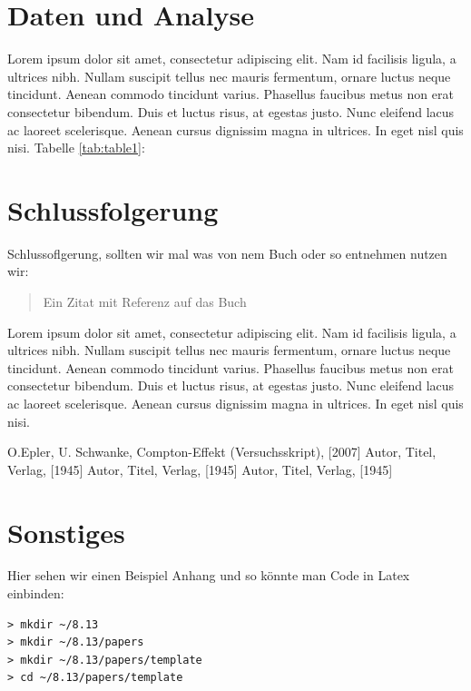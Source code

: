 \documentclass[aps,twocolumn,secnumarabic,nobalancelastpage,amsmath,amssymb,
nofootinbib,superscriptaddress]{revtex4-1}
\begin{document}
\section{Daten und Analyse}

Lorem ipsum dolor sit amet, consectetur adipiscing elit. Nam id facilisis ligula,
a ultrices nibh. Nullam suscipit tellus nec mauris fermentum, ornare luctus neque
tincidunt. Aenean commodo tincidunt varius. Phasellus faucibus metus non erat
consectetur bibendum. Duis et luctus risus, at egestas justo. Nunc eleifend lacus
ac laoreet scelerisque. Aenean cursus dignissim magna in ultrices. In eget nisl
quis nisi. Tabelle \ref{tab:table1}:







\section{Schlussfolgerung}

Schlussoflgerung, sollten wir mal was von nem Buch oder so entnehmen nutzen wir:


\begin{quote}
  Ein Zitat mit Referenz auf das Buch\cite{melissinos1966}
\end{quote}

Lorem ipsum dolor sit amet, consectetur adipiscing elit. Nam id facilisis ligula,
a ultrices nibh. Nullam suscipit tellus nec mauris fermentum, ornare luctus neque
tincidunt. Aenean commodo tincidunt varius. Phasellus faucibus metus non erat
consectetur bibendum. Duis et luctus risus, at egestas justo. Nunc eleifend lacus
ac laoreet scelerisque. Aenean cursus dignissim magna in ultrices. In eget nisl
quis nisi.




\begin{thebibliography}{99}
O.Epler, U. Schwanke, Compton-Effekt (Versuchsskript),  [2007]
Autor, Titel, Verlag,  [1945]
Autor, Titel, Verlag,  [1945]
Autor, Titel, Verlag,  [1945]
\end{thebibliography}


\clearpage
\appendix

\section{Sonstiges}
Hier sehen wir einen Beispiel Anhang und so könnte man Code in Latex einbinden:
\begin{verbatim}
> mkdir ~/8.13
> mkdir ~/8.13/papers
> mkdir ~/8.13/papers/template
> cd ~/8.13/papers/template
\end{verbatim}


\end{document}
